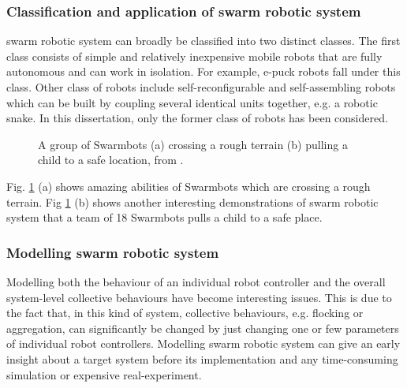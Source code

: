 \subsubsection*{Classification and application of swarm robotic system}
swarm robotic system can broadly be classified into two distinct classes. The first class consists of simple and relatively inexpensive mobile robots that are fully autonomous and can work in isolation. For example, e-puck robots \cite{Cianci+2004} fall under this class. Other class of robots include self-reconfigurable \cite{Fukuda+1987} and self-assembling robots which can be built by coupling several identical units together, e.g. a robotic snake. In this dissertation, only the former class of robots has been considered. 
\begin{figure}[H]
\centering
{}
\hspace{0.5cm}
\caption{A group of Swarmbots (a) crossing a rough terrain (b) pulling a child to a safe location, from \protect{}.}
\label{fig:swarmbots} %
\end{figure}

Fig. \ref{fig:swarmbots} (a) shows amazing abilities of Swarmbots which are crossing a rough terrain. Fig \ref{fig:swarmbots} (b) shows another interesting demonstrations of swarm robotic system that a team of 18 Swarmbots pulls a child to a safe place.
\subsubsection*{Modelling swarm robotic system}
Modelling both the behaviour of an individual robot controller and the overall system-level collective behaviours have become interesting issues. This is due to the fact that, in this kind of system, collective behaviours, e.g. flocking or aggregation, can significantly be changed by just changing one or few parameters of individual robot controllers. Modelling swarm robotic system can give an early insight about a target system before its implementation and any time-consuming simulation or expensive real-experiment.

